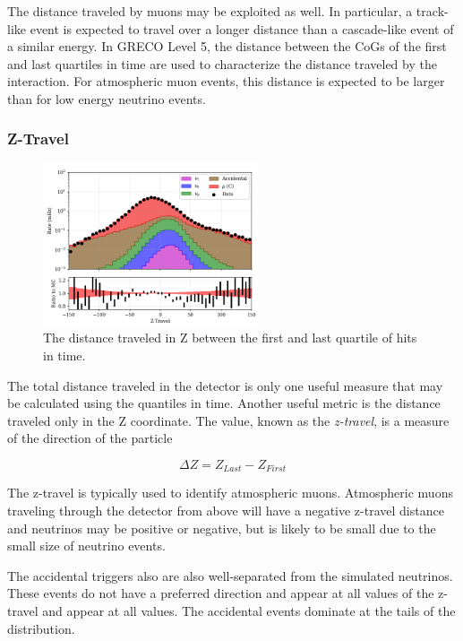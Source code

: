 The distance traveled by muons may be exploited as well.
In particular, a track-like event is expected to travel over a longer distance than a cascade-like event of a similar energy.
In GRECO Level 5, the distance between the CoGs of the first and last quartiles in time are used to characterize the distance traveled by the interaction.
For atmospheric muon events, this distance is expected to be larger than for low energy neutrino events.

\subsubsection{Z-Travel}
\begin{figure}[h]
	\centering
		\includegraphics[width=2.5in]{Z-Travel_log.png}
		\caption[Quartile Z-Travel]{The distance traveled in Z between the first and last quartile of hits in time.}
	\label{fig:quartile_ztravel}
\end{figure}

The total distance traveled in the detector is only one useful measure that may be calculated using the quantiles in time.
Another useful metric is the distance traveled only in the Z coordinate. 
The value, known as the \emph{z-travel}, is a measure of the direction of the particle

\begin{equation}
\Delta Z = Z_{Last} - Z_{First} 
\end{equation}

The z-travel is typically used to identify atmospheric muons.
Atmospheric muons traveling through the detector from above will have a negative z-travel distance and neutrinos may be positive or negative, but is likely to be small due to the small size of neutrino events.

The accidental triggers also are also well-separated from the simulated neutrinos.
These events do not have a preferred direction and appear at all values of the z-travel and appear at all values.
The accidental events dominate at the tails of the distribution.

